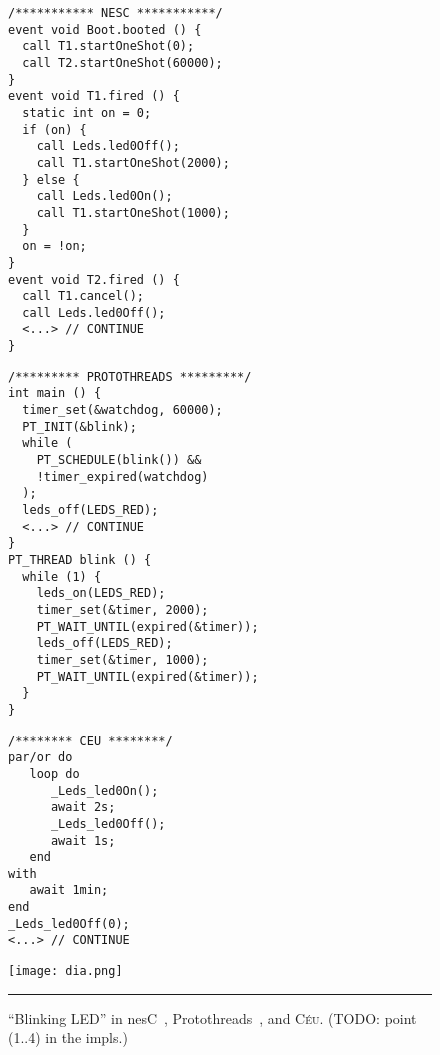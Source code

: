 \documentclass[10pt]{sensys-proc}
\newcommand{\CEU}{\textsc{C\'{e}u}\xspace}
\begin{document}
\begin{figure*}[!t]
\begin{minipage}[t]{0.24\linewidth}
{\small
\begin{verbatim}
/*********** NESC ***********/
event void Boot.booted () {
  call T1.startOneShot(0);
  call T2.startOneShot(60000);
}
event void T1.fired () {
  static int on = 0;
  if (on) {
    call Leds.led0Off();
    call T1.startOneShot(2000);
  } else {
    call Leds.led0On();
    call T1.startOneShot(1000);
  }
  on = !on;
}
event void T2.fired () {
  call T1.cancel();
  call Leds.led0Off();
  <...> // CONTINUE
}
\end{verbatim}
}
\end{minipage}
%
\hfill \vrule \hfill
\hspace{0.0cm}
%
\begin{minipage}[t]{0.28\linewidth}
{\small
\begin{verbatim}
/********* PROTOTHREADS *********/
int main () {
  timer_set(&watchdog, 60000);
  PT_INIT(&blink);
  while (
    PT_SCHEDULE(blink()) &&
    !timer_expired(watchdog)
  );
  leds_off(LEDS_RED);
  <...> // CONTINUE
}
PT_THREAD blink () {
  while (1) {
    leds_on(LEDS_RED);
    timer_set(&timer, 2000);
    PT_WAIT_UNTIL(expired(&timer));
    leds_off(LEDS_RED);
    timer_set(&timer, 1000);
    PT_WAIT_UNTIL(expired(&timer));
  }
}
\end{verbatim}
}
\end{minipage}
%
\hfill \vrule \hfill
\hspace{0.0cm}
%
\begin{minipage}[t]{0.18\linewidth}
{\small
\begin{verbatim}
/******** CEU ********/
par/or do
   loop do
      _Leds_led0On();
      await 2s;
      _Leds_led0Off();
      await 1s;
   end
with
   await 1min;
end
_Leds_led0Off(0);
<...> // CONTINUE
\end{verbatim}
}
\end{minipage}
%
\hfill \vrule \hfill
\hspace{0.0cm}
%
\begin{minipage}[t]{0.15\linewidth}
\vspace{0pt}
\centering
\texttt{[image: dia.png]}
\end{minipage}
%
\hspace{0.0cm}
%
\rule{18cm}{0.37pt}
\caption{ ``Blinking LED'' in
    nesC~\cite{wsn.nesc},
    Protothreads~\cite{wsn.protothreads},
    and \CEU.
    (TODO: point (1..4) in the impls.)
\label{lst.all}
}
\end{figure*}
\end{document}
